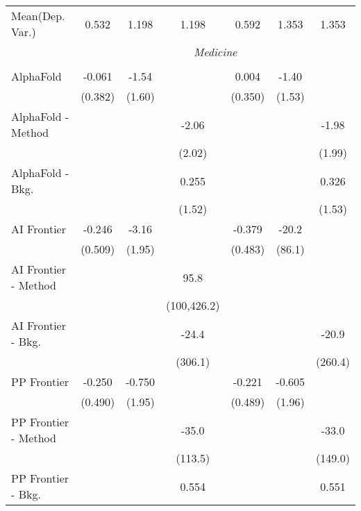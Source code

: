 \begin{tabular}{lcccccc}
Mean(Dep. Var.) & 0.532 & 1.198 & 1.198 & 0.592 & 1.353 & 1.353 \\
 & \multicolumn{6}{c}{\textit{Medicine}} \\ \\
   AlphaFold            & -0.061  & -1.54       &             & 0.004        & -1.40       &   \\   
                        & (0.382) & (1.60)      &             & (0.350)      & (1.53)      &   \\   
   AlphaFold - Method   &         &             & -2.06       &              &             & -1.98\\   
                        &         &             & (2.02)      &              &             & (1.99)\\   
   AlphaFold - Bkg.     &         &             & 0.255       &              &             & 0.326\\   
                        &         &             & (1.52)      &              &             & (1.53)\\   
   AI Frontier          & -0.246  & -3.16       &             & -0.379       & -20.2       &   \\   
                        & (0.509) & (1.95)      &             & (0.483)      & (86.1)      &   \\   
   AI Frontier - Method &         &             & 95.8        &              &             &   \\   
                        &         &             & (100,426.2) &              &             &   \\   
   AI Frontier - Bkg.   &         &             & -24.4       &              &             & -20.9\\   
                        &         &             & (306.1)     &              &             & (260.4)\\   
   PP Frontier          & -0.250  & -0.750      &             & -0.221       & -0.605      &   \\   
                        & (0.490) & (1.95)      &             & (0.489)      & (1.96)      &   \\   
   PP Frontier - Method &         &             & -35.0       &              &             & -33.0\\   
                        &         &             & (113.5)     &              &             & (149.0)\\   
   PP Frontier - Bkg.   &         &             & 0.554       &              &             & 0.551\\   

\end{tabular}
